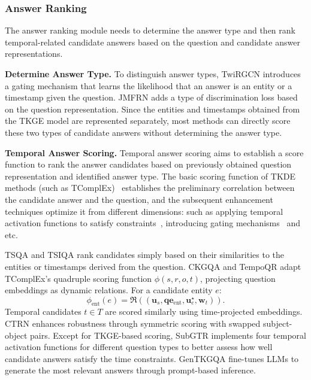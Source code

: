 {\subsubsection{Answer Ranking}
The answer ranking module needs to determine the answer type and then rank temporal-related candidate answers based on the question and candidate answer representations.

\textbf{Determine Answer Type.}
To distinguish answer types, TwiRGCN introduces a gating mechanism that learns the likelihood that an answer is an entity or a timestamp given the question. JMFRN adds a type of discrimination loss based on the question representation.
Since the entities and timestamps obtained from the TKGE model are represented separately, most methods can directly score these two types of candidate answers without determining the answer type.

\textbf{Temporal Answer Scoring.}
Temporal answer scoring aims to establish a score function to rank the answer candidates based on previously obtained question representation and identified answer type.
The basic scoring function of TKDE methods (such as TComplEx)~\cite{saxenaQuestionAnsweringTemporal2021,mavromatisTempoQRTemporalQuestion2022,zhangMusTQTemporalKnowledge2024} establishes the preliminary correlation between the candidate answer and the question, and the subsequent enhancement techniques optimize it from different dimensions: such as applying temporal activation functions to satisfy  constraints~\cite{chenTemporalKnowledgeGraph2022}, introducing gating mechanisms~\cite{sharmaTwiRGCNTemporallyWeighted2023} and etc.

TSQA and TSIQA rank candidates simply based on their similarities to the entities or timestamps derived from the question.
C{}KGQA and TempoQR adapt TComplEx's quadruple scoring function $\phi(s,r,o,t)$, projecting question embeddings as dynamic relations. For a candidate entity $e$:
\begin{equation}
\label{eq:entity}
\phi_{\text{ent}}(e) = \mathfrak{R} \left( (\bm{u}_s, \bm{q}\bm{e}_{\text{ent}}, \bm{u}^\star_e, \bm{w}_t) \right).
\end{equation}
Temporal candidates $t\in T$ are scored similarly using time-projected embeddings.
CTRN enhances robustness through symmetric scoring with swapped subject-object pairs.
Except for TKGE-based scoring, SubGTR implements four temporal activation functions for different question types to better assess how well candidate answers satisfy the time constraints.
GenTKGQA fine-tunes LLMs to generate the most relevant answers through prompt-based inference.


}
